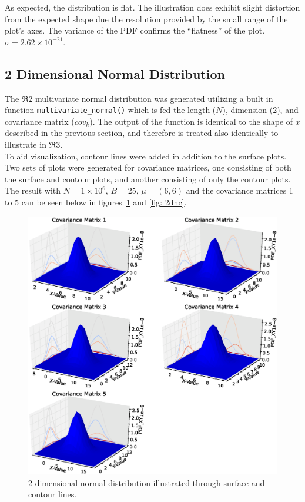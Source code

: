 As expected, the distribution is flat. The illustration does exhibit slight distortion from the expected shape due the resolution provided by the small range of the plot's axes. The variance of the PDF confirms the ``flatness'' of the plot. $\sigma = 2.62 \times 10^{-21}$.

\subsection{2 Dimensional Normal Distribution} 
The $\Re2$ multivariate normal distribution was generated utilizing a built in function \verb|multivariate_normal()| which is fed the length ($N$), dimension (2), and covariance matrix ($cov_k$). The output of the function is identical to the shape of $x$ described in the previous section, and therefore is treated also identically to illustrate in $\Re3$.  \\

To aid visualization, contour lines were added in addition to the surface plots. Two sets of plots were generated for covariance matrices, one consisting of both the surface and contour plots, and another consisting of only the contour plots. The result with $N = 1 \times 10^6$, $B = 25$, $\mu = (6,6)$ and the covariance matrices 1 to 5 can be seen below in figures~\ref{fig: 2dn} and \ref{fig: 2dnc}.
\begin{figure}[H] 
	\centering 
	\includegraphics[width=\linewidth]{figure_2}
	\caption{2 dimensional normal distribution illustrated through surface and contour lines.}
	\label{fig: 2dn} 
\end{figure}


